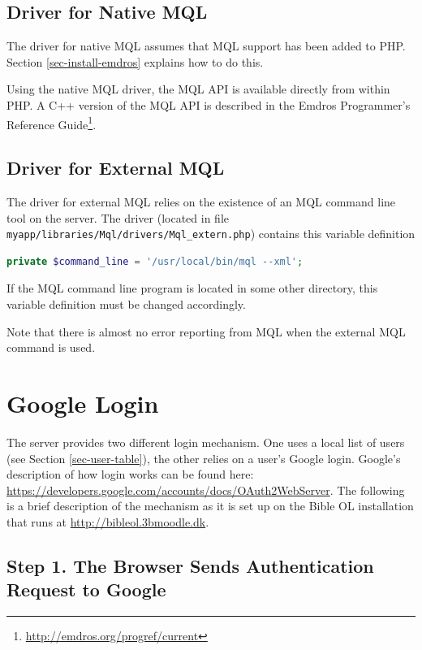 \documentclass[11pt,oneside,a4paper]{memoir}
\begin{document}
\subsection{Driver for Native MQL}\label{mql-native}

The driver for native MQL assumes that MQL support has been added to PHP. Section
\ref{sec-install-emdros} explains how to do this.

Using the native MQL driver, the MQL API is available directly from within PHP. A C++ version of the
MQL API is described in the Emdros Programmer's Reference
Guide\footnote{\url{http://emdros.org/progref/current}}.

\subsection{Driver for External MQL}\label{mql-extern}

The driver for external MQL relies on the existence of an MQL command line tool on the server. The
driver (located in file \texttt{myapp/libraries/Mql/drivers/Mql\_extern.php}) contains this variable
definition

\begin{lstlisting}[language=PHP]
private $command_line = '/usr/local/bin/mql --xml';
\end{lstlisting}

If the MQL command line program is located in some other directory, this variable definition must be
changed accordingly.

Note that there is almost no error reporting from MQL when the external MQL command is used.


\section{Google Login}\label{sec-google-login}

The server provides two different login mechanism. One uses a local list of users (see Section
\ref{sec-user-table}), the other relies on a user's Google login. Google's description of how login
works can be found here: \url{https://developers.google.com/accounts/docs/OAuth2WebServer}.
The following is a brief description of the mechanism as it is set up on the Bible OL installation
that runs at \url{http://bibleol.3bmoodle.dk}.

\subsection*{Step 1. The Browser Sends Authentication Request to Google}
\end{document}
